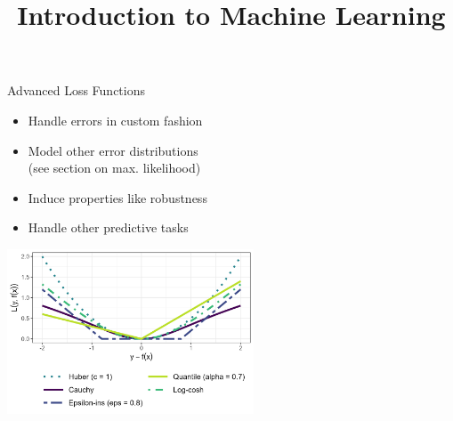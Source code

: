 \documentclass[11pt,compress,t,notes=noshow, xcolor=table]{beamer}
\title{Introduction to Machine Learning}
\begin{document}
    

\begin{vbframe}{Advanced Loss Functions }

\begin{itemize}
\item Handle errors in custom fashion
\item Model other error distributions\\
(see section on max. likelihood)
\item Induce properties like robustness
\item Handle other predictive tasks
\end{itemize}

\vfill

\begin{center}
\includegraphics[width = 0.55\textwidth]{figure/plot_loss_overview.png}
\end{center}





\vspace{1cm}

\end{vbframe}
\end{document}

